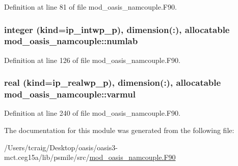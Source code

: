 Definition at line 81 of file mod\+\_\+oasis\+\_\+namcouple.\+F90.

\hypertarget{classmod__oasis__namcouple_a12e1621f5697a0cdbde11d3e25f43b54}{
\subsubsection[{numlab}]{\setlength{\rightskip}{0pt plus 5cm}integer (kind=ip\+\_\+intwp\+\_\+p), dimension(\+:), allocatable mod\+\_\+oasis\+\_\+namcouple\+::numlab\hspace{0.3cm}{\ttfamily [private]}}}\label{classmod__oasis__namcouple_a12e1621f5697a0cdbde11d3e25f43b54}


Definition at line 126 of file mod\+\_\+oasis\+\_\+namcouple.\+F90.

\hypertarget{classmod__oasis__namcouple_ab7c38fd6bd90bb8e6ebfb539ead1f1a9}{
\subsubsection[{varmul}]{\setlength{\rightskip}{0pt plus 5cm}real (kind=ip\+\_\+realwp\+\_\+p), dimension(\+:), allocatable mod\+\_\+oasis\+\_\+namcouple\+::varmul\hspace{0.3cm}{\ttfamily [private]}}}\label{classmod__oasis__namcouple_ab7c38fd6bd90bb8e6ebfb539ead1f1a9}


Definition at line 240 of file mod\+\_\+oasis\+\_\+namcouple.\+F90.



The documentation for this module was generated from the following file\+:\begin{DoxyCompactItemize}
\item 
/\+Users/tcraig/\+Desktop/oasis/oasis3-\/mct.\+ceg15a/lib/psmile/src/\hyperlink{mod__oasis__namcouple_8_f90}{mod\+\_\+oasis\+\_\+namcouple.\+F90}\end{DoxyCompactItemize}
